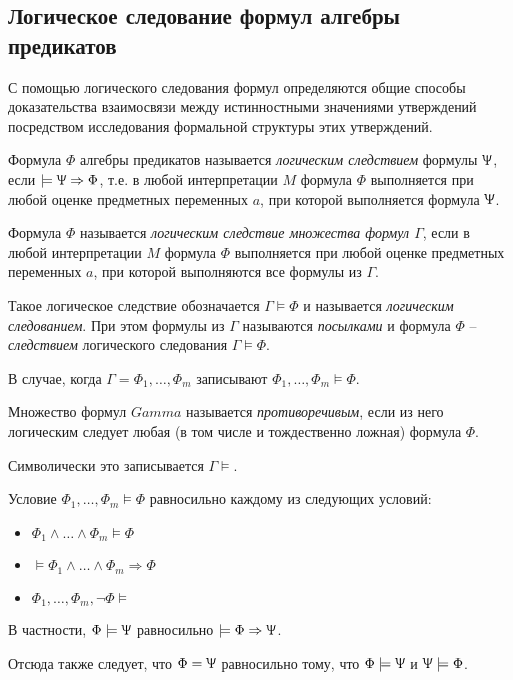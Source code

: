 \subsection*{Логическое следование формул алгебры предикатов}
С помощью логического следования формул 
определяются общие способы доказательства 
взаимосвязи между истинностными значениями 
утверждений посредством исследования 
формальной структуры этих утверждений.

\begin{definition}
    Формула $\Phi$ алгебры предикатов называется \textit{логическим следствием} формулы $\Uppsi$, если $\models\Uppsi\Rightarrow\Phi$, т.е. в любой интерпретации $M$ формула $\Phi$ выполняется при любой оценке предметных переменных $a$, при которой выполняется формула $\Uppsi$.
\end{definition}

\begin{definition}
    Формула $\Phi$ называется \textit{логическим следствие множества формул $\Gamma $}, если в любой интерпретации $M$ формула $\Phi $ выполняется при любой оценке предметных переменных $a$, при которой выполняются все формулы из $\Gamma$.

    Такое логическое следствие обозначается $\Gamma\models\Phi$ и называется \textit{логическим следованием}. При этом формулы из $\Gamma $ называются \textit{посылками} и формула $\Phi$ -- \textit{следствием} логического следования $\Gamma\models\Phi$.

    В случае, когда $\Gamma = {\Phi_1,\ldots,\Phi_m}$ записывают $\Phi_1,\ldots,\Phi_m\models\Phi$.
\end{definition}

\begin{definition}
    Множество формул $Gamma$ называется \textit{противоречивым}, если из него логическим следует любая (в том числе и тождественно ложная) формула $\Phi$. 

    Символически это записывается $\Gamma\models$.
\end{definition}

\begin{lemma}
    Условие $\Phi_1,\ldots,\Phi_m\models\Phi$ равносильно каждому из следующих условий:
    \begin{itemize}
        \item $\Phi_1\land\ldots\land\Phi_m\models\Phi$
        \item $\models\Phi_1\land\ldots\land\Phi_m\Rightarrow\Phi$
        \item $\Phi_1,\ldots,\Phi_m,\lnot\Phi\models$
    \end{itemize}
    В частности, $\Phi\models\Uppsi$ равносильно $\models\Phi\Rightarrow\Uppsi$. 

    Отсюда также следует, что $\Phi=\Uppsi$ равносильно тому, что $\Phi\models\Uppsi$ и $\Uppsi\models\Phi$.
\end{lemma}

